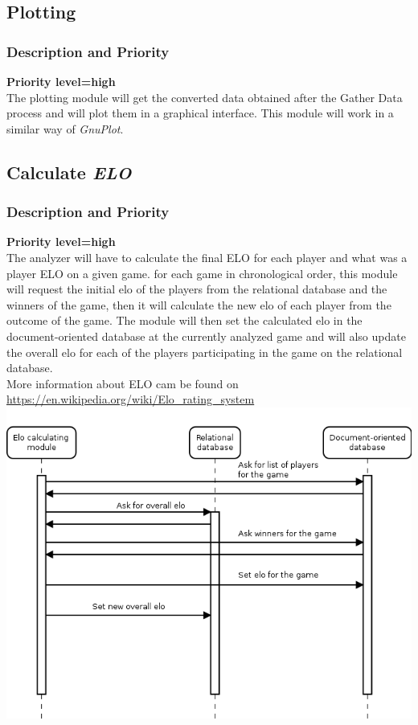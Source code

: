 \documentclass{scrreprt}
\begin{document}
\subsection{Plotting}
\subsubsection{Description and Priority}
\textbf{Priority level=high}\\
The plotting module will get the converted data obtained after the Gather Data process and will plot them in a graphical interface. This module will work in a similar way of \textit{GnuPlot}.

\subsection{Calculate \textit{\textbf{ELO}}}
\subsubsection{Description and Priority}
\textbf{Priority level=high}\\
The analyzer will have to calculate the final ELO for each player and what was a
player ELO on a given game.
for each game in chronological order, this module will request the initial elo of the players from the relational database and the winners of the game, then it will calculate the new elo of each player from the outcome of the game. The module will then set the calculated elo in the document-oriented database at the currently analyzed game and will also update the overall elo for each of the players participating in the game on the relational database.\\
More information about ELO cam be found on \url{https://en.wikipedia.org/wiki/Elo_rating_system}\\
\includegraphics[width=\textwidth,height=\textheight,keepaspectratio]{elocalc}\\
\end{document}
